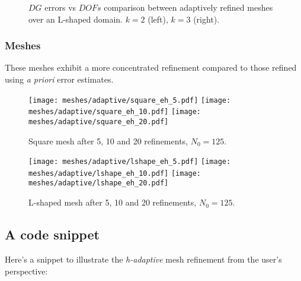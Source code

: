 \begin{figure}[!ht]
	\begin{subfigure}[b]{0.45\textwidth}
		
	\end{subfigure}
	\hfill
	\begin{subfigure}[b]{0.45\textwidth}
	\end{subfigure}
    \caption{$DG$ errors vs $DOFs$ comparison between adaptively refined meshes over an L-shaped domain. $k = 2$ (left), $k = 3$ (right).}
\end{figure}

\newpage
\subsubsection{Meshes}

These meshes exhibit a more concentrated refinement compared to those refined using \textit{a priori} error estimates.

\begin{figure}[!ht]
	\centering
	\texttt{[image: meshes/adaptive/square\_eh\_5.pdf]}
	\texttt{[image: meshes/adaptive/square\_eh\_10.pdf]}
	\texttt{[image: meshes/adaptive/square\_eh\_20.pdf]}
	\caption{Square mesh after 5, 10 and 20 refinements, $N_0 = 125$.}
\end{figure}

\begin{figure}[!ht]
	\centering
	\texttt{[image: meshes/adaptive/lshape\_eh\_5.pdf]}
	\texttt{[image: meshes/adaptive/lshape\_eh\_10.pdf]}
	\texttt{[image: meshes/adaptive/lshape\_eh\_20.pdf]}
	\caption{L-shaped mesh after 5, 10 and 20 refinements, $N_0 = 125$.}
\end{figure}

\newpage
\subsection{A code snippet}

Here's a snippet to illustrate the \textit{h-adaptive} mesh refinement from the user's perspective:

